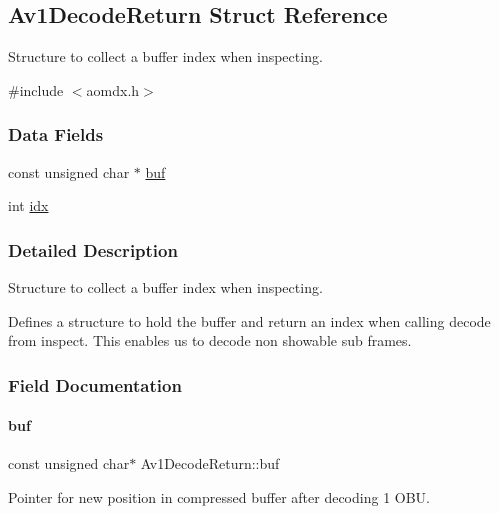 \hypertarget{structAv1DecodeReturn}{}\subsection{Av1\+Decode\+Return Struct Reference}
\label{structAv1DecodeReturn}


Structure to collect a buffer index when inspecting.  




{\ttfamily \#include $<$aomdx.\+h$>$}

\subsubsection*{Data Fields}
\begin{DoxyCompactItemize}
\item 
const unsigned char $\ast$ \hyperlink{structAv1DecodeReturn_aab2b7d54d778b8d5ef5b475b4460ee9f}{buf}
\item 
int \hyperlink{structAv1DecodeReturn_aeefcb8b1f412902428fa86ea066e4414}{idx}
\end{DoxyCompactItemize}


\subsubsection{Detailed Description}
Structure to collect a buffer index when inspecting. 

Defines a structure to hold the buffer and return an index when calling decode from inspect. This enables us to decode non showable sub frames. 

\subsubsection{Field Documentation}
\mbox{\label{structAv1DecodeReturn_aab2b7d54d778b8d5ef5b475b4460ee9f}} 
\paragraph{\texorpdfstring{buf}{buf}}
{\footnotesize\ttfamily const unsigned char$\ast$ Av1\+Decode\+Return\+::buf}

Pointer for new position in compressed buffer after decoding 1 O\+BU. \mbox{\label{structAv1DecodeReturn_aeefcb8b1f412902428fa86ea066e4414}} 
